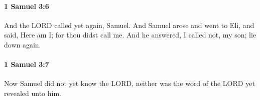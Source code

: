 		\paragraph{1 Samuel 3:6} %
			\label{1SAMUEL-3-6}

			And the LORD called yet again, Samuel. And Samuel arose and went to Eli, and said, Here am I; for thou didst call me. And he answered, I called not, my son; lie down again.


		\paragraph{1 Samuel 3:7} %
			\label{1SAMUEL-3-7}

			Now Samuel did not yet know the LORD, neither was the word of the LORD yet revealed unto him.


